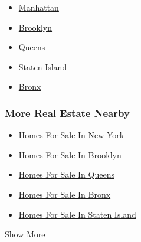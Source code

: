 \begin{itemize}
\tightlist
\item
  \href{/real-estate/usa/ny/new-yorknew-york-ny-usa/homes-for-sale}{Manhattan}
\item
  \href{/real-estate/usa/ny/brooklynbrooklyn-ny-usa/homes-for-sale}{Brooklyn}
\item
  \href{/real-estate/usa/ny/queensqueens-ny-usa/homes-for-sale}{Queens}
\item
  \href{/real-estate/usa/ny/staten-islandstaten-island-ny-usa/homes-for-sale}{Staten
  Island}
\item
  \href{/real-estate/usa/ny/bronxbronx-ny-usa/homes-for-sale}{Bronx}
\end{itemize}

\hypertarget{more-real-estate-nearby}{%
\subsubsection{More Real Estate Nearby}\label{more-real-estate-nearby}}

\begin{itemize}
\tightlist
\item
  \href{/real-estate/usa/ny/new-yorknew-york-ny-usa/homes-for-sale}{Homes
  For Sale In New York}
\item
  \href{/real-estate/usa/ny/brooklynbrooklyn-ny-usa/homes-for-sale}{Homes
  For Sale In Brooklyn}
\item
  \href{/real-estate/usa/ny/queensqueens-ny-usa/homes-for-sale}{Homes
  For Sale In Queens}
\item
  \href{/real-estate/usa/ny/bronxbronx-ny-usa/homes-for-sale}{Homes For
  Sale In Bronx}
\item
  \href{/real-estate/usa/ny/staten-islandstaten-island-ny-usa/homes-for-sale}{Homes
  For Sale In Staten Island}
\end{itemize}

Show More

